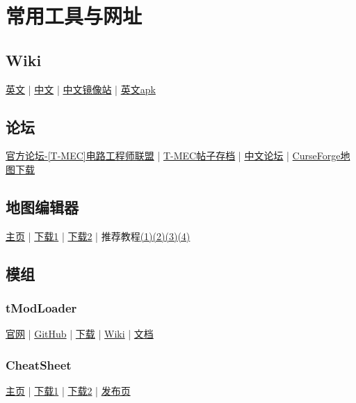 \chapter{常用工具与网址}\label{app1}

\section{Wiki}\label{app2}
\href{https://terraria.gamepedia.com/Terraria_Wiki}{英文} | \href{https://terraria-zh.gamepedia.com/Terraria_Wiki}{中文} | \href{http://terraria.1tu.me/}{中文镜像站} | \href{https://terraria-wiki.fileplanet.com/apk/download#}{英文apk}

\section{论坛}
\href{https://forums.terraria.org/index.php?forums/t-mec-terraria-mechanical-engineering-corps.194/}{官方论坛-[T-MEC]电路工程师联盟} | \href{https://github.com/putianyi889/TMECbackup}{T-MEC帖子存档} | \href{https://www.bbstr.net/}{中文论坛} | \href{https://www.curseforge.com/terraria/maps}{CurseForge地图下载}

\section{地图编辑器}\label{app3}
\href{https://github.com/TEdit/Terraria-Map-Editor}{主页} | \href{http://www.binaryconstruct.com/downloads/}{下载1} | \href{https://github.com/TEdit/Terraria-Map-Editor/releases}{下载2} | 推荐教程\href{http://v.youku.com/v_show/id_XMjYxNTUzOTMyOA}{(1)}\href{http://v.youku.com/v_show/id_XMjY0NDYwMTM3Ng}{(2)}\href{http://v.youku.com/v_show/id_XMjY1OTIzNjg4OA}{(3)}\href{http://v.youku.com/v_show/id_XMjY3ODQwODE1Ng}{(4)}

\section{模组}
\subsection{tModLoader}\label{app4}
\href{https://www.tmodloader.net/}{官网} | \href{https://github.com/tModLoader/tModLoader}{GitHub} | \href{https://github.com/tModLoader/tModLoader/releases}{下载} | \href{https://github.com/tModLoader/tModLoader/wiki}{Wiki} | \href{https://tmodloader.github.io/tModLoader/html/annotated.html}{文档}

\subsection{CheatSheet}\label{app5}
\href{https://github.com/JavidPack/CheatSheet}{主页} | \href{http://javid.ddns.net/tModLoader/download.php?Down=mods/CheatSheet.tmod}{下载1} | \href{https://github.com/JavidPack/CheatSheet/releases}{下载2} | \href{https://forums.terraria.org/index.php?threads/cheat-sheet.41407/}{发布页}

